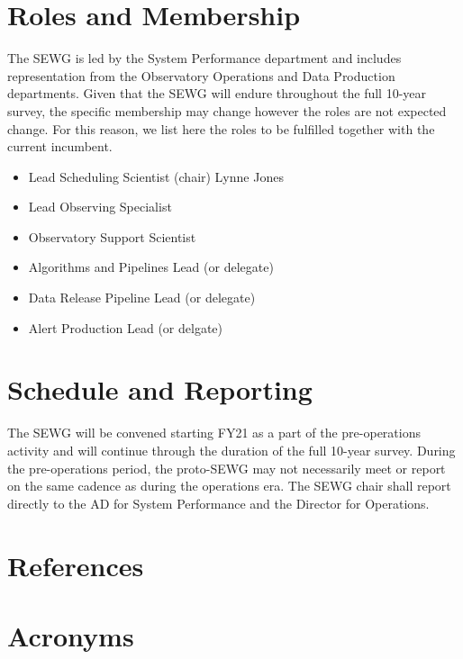 \documentclass[DM,authoryear,toc]{lsstdoc}
\begin{document}
\section{Roles and Membership}

The SEWG is led by the System Performance department and includes representation from the Observatory Operations and Data Production departments. 
Given that the SEWG will endure  throughout the full 10-year survey,  the specific membership may change however the roles are not expected change. 
For this reason, we list here the roles to be fulfilled together with the current incumbent. 

\begin{itemize}
\item {
Lead Scheduling Scientist (chair)  
 Lynne Jones
}
\item{
Lead Observing Specialist
}
\item{
Observatory Support Scientist
}
\item{
Algorithms and Pipelines Lead (or delegate)
}
\item{
Data Release Pipeline Lead (or delegate)
}
\item{
Alert Production Lead (or delgate)
}
\end{itemize}

\section{Schedule and Reporting}

The SEWG will be convened starting FY21 as a part of the pre-operations activity and will continue through the duration of the full 10-year survey.  
During the pre-operations period, the proto-SEWG may not necessarily meet or report on the same cadence as    during the operations era. 
The SEWG chair shall report directly to the AD for System Performance and the Director for Operations. 


\appendix
\section{References} \label{sec:bib}
\renewcommand{\refname}{} %


\section{Acronyms} \label{sec:acronyms}

\end{document}
